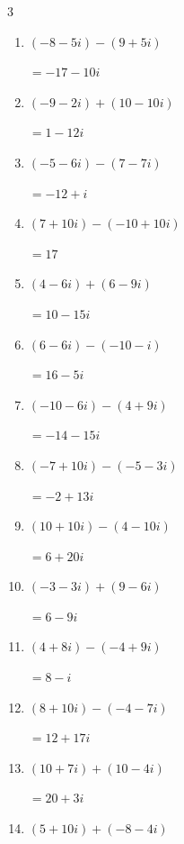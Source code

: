 \begin{multicols}{3}
\begin{enumerate}
  \item $\displaystyle (-8-5i) - (9+5i)$

        $\displaystyle =-17-10i$

  \item $\displaystyle (-9-2i) + (10-10i)$

        $\displaystyle =1-12i$

  \item $\displaystyle (-5-6i) - (7-7i)$

        $\displaystyle =-12+i$

  \item $\displaystyle (7+10i) - (-10+10i)$

        $\displaystyle =17$

  \item $\displaystyle (4-6i) + (6-9i)$

        $\displaystyle =10-15i$

  \item $\displaystyle (6-6i) - (-10-i)$

        $\displaystyle =16-5i$

  \item $\displaystyle (-10-6i) - (4+9i)$

        $\displaystyle =-14-15i$

  \item $\displaystyle (-7+10i) - (-5-3i)$

        $\displaystyle =-2+13i$

  \item $\displaystyle (10+10i) - (4-10i)$

        $\displaystyle =6+20i$

  \item $\displaystyle (-3-3i) + (9-6i)$

        $\displaystyle =6-9i$

  \item $\displaystyle (4+8i) - (-4+9i)$

        $\displaystyle =8-i$

  \item $\displaystyle (8+10i) - (-4-7i)$

        $\displaystyle =12+17i$

\columnbreak %

  \item $\displaystyle (10+7i) + (10-4i)$

        $\displaystyle =20+3i$

  \item $\displaystyle (5+10i) + (-8-4i)$


\end{enumerate}
\end{multicols}

